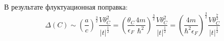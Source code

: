 \documentclass[a4paper,12pt]{article} %
\begin{document}
\begin{ttask}
В результате флуктуационная поправка:
$$
\Delta(C) \sim\left(\frac{a}{c}\right)^{\frac{3}{2}} \frac{V \theta_{C}^{2}}{|t|^{\frac{1}{2}}}=\left(\frac{\theta_{C}}{\epsilon_{F}} \frac{4 m}{\hbar^{2}}\right)^{\frac{3}{2}} \frac{V \theta_{C}^{2}}{|t|^{\frac{1}{2}}}=\left(\frac{4 m}{\hbar^{2} \epsilon_{F}}\right)^{\frac{3}{2}} \frac{V \theta_{C}^{\frac{7}{2}}}{|t|^{\frac{1}{2}}}
$$







































\end{ttask}
\end{document}
